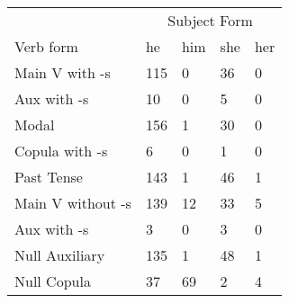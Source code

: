 \begin{table}[]
\begin{minipage}{0.5\textwidth}
\end{minipage}
\begin{minipage}{0.5\textwidth}
    \begin{tabular}{@{}lllll@{}}
        \toprule
            &\multicolumn{4}{c}{Subject Form}\\
            \cline{2-5}
        Verb form & he & him & she & her \\
        \midrule
        Main V with -s & 115 & 0 & 36 & 0 \\
        Aux with -s & 10 & 0 & 5 & 0 \\
        Modal & 156 & 1 & 30 & 0 \\
        Copula with -s & 6 & 0 & 1 & 0 \\
        Past Tense & 143 & 1 & 46 & 1 \\
        \hline
        Main V without -s & 139 & 12 & 33 & 5 \\
        Aux with -s & 3 & 0 & 3 & 0 \\
        Null Auxiliary & 135 & 1 & 48 & 1 \\
        Null Copula & 37 & 69 & 2 & 4 \\
        \bottomrule
    \end{tabular}
\end{minipage}
\end{table}
